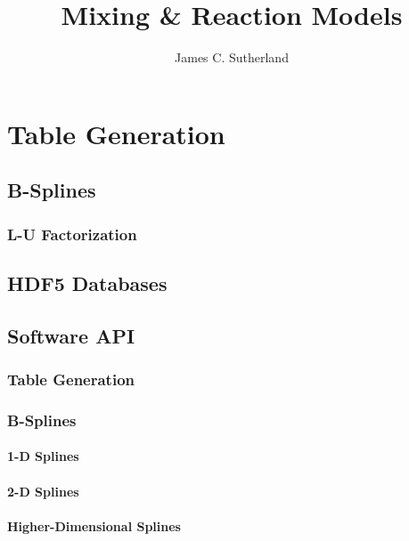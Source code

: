 \documentclass[10pt]{book}
\begin{document}
\title{Mixing \& Reaction Models}

\author{James C. Sutherland}




\chapter{Table Generation}
\section{B-Splines}
\subsection{L-U Factorization}
\section{HDF5 Databases}
\section{Software API}
\subsection{Table Generation}
\subsection{B-Splines}
\subsubsection{1-D Splines}
\subsubsection{2-D Splines}
\subsubsection{Higher-Dimensional Splines}

\end{document}
